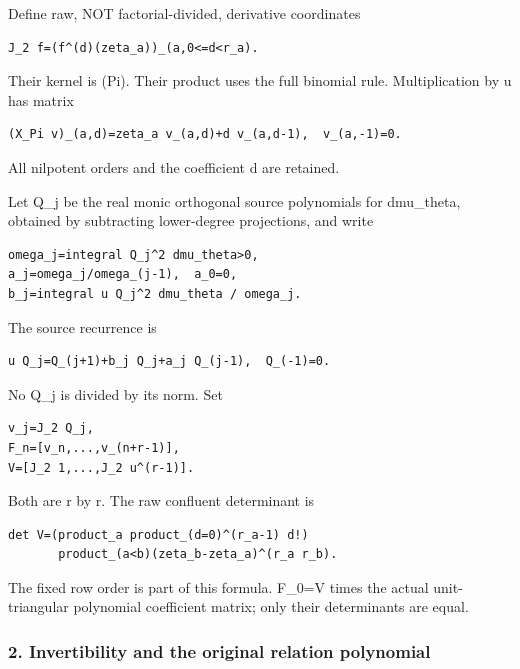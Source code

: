 Define raw, NOT factorial-divided, derivative coordinates

\begin{verbatim}
J_2 f=(f^(d)(zeta_a))_(a,0<=d<r_a).
\end{verbatim}

Their kernel is (Pi). Their product uses the full binomial rule. Multiplication by u has matrix

\begin{verbatim}
(X_Pi v)_(a,d)=zeta_a v_(a,d)+d v_(a,d-1),  v_(a,-1)=0.
\end{verbatim}

All nilpotent orders and the coefficient d are retained.

Let Q\_j be the real monic orthogonal source polynomials for dmu\_theta, obtained by subtracting lower-degree projections, and write

\begin{verbatim}
omega_j=integral Q_j^2 dmu_theta>0,
a_j=omega_j/omega_(j-1),  a_0=0,
b_j=integral u Q_j^2 dmu_theta / omega_j.
\end{verbatim}

The source recurrence is

\begin{verbatim}
u Q_j=Q_(j+1)+b_j Q_j+a_j Q_(j-1),  Q_(-1)=0.
\end{verbatim}

No Q\_j is divided by its norm. Set

\begin{verbatim}
v_j=J_2 Q_j,
F_n=[v_n,...,v_(n+r-1)],
V=[J_2 1,...,J_2 u^(r-1)].
\end{verbatim}

Both are r by r. The raw confluent determinant is

\begin{verbatim}
det V=(product_a product_(d=0)^(r_a-1) d!)
       product_(a<b)(zeta_b-zeta_a)^(r_a r_b).
\end{verbatim}

The fixed row order is part of this formula. F\_0=V times the actual unit-triangular polynomial coefficient matrix; only their determinants are equal.

\subsubsection{2. Invertibility and the original relation polynomial}\label{endpoint-pr24_original--invertibility-and-the-original-relation-polynomial}

